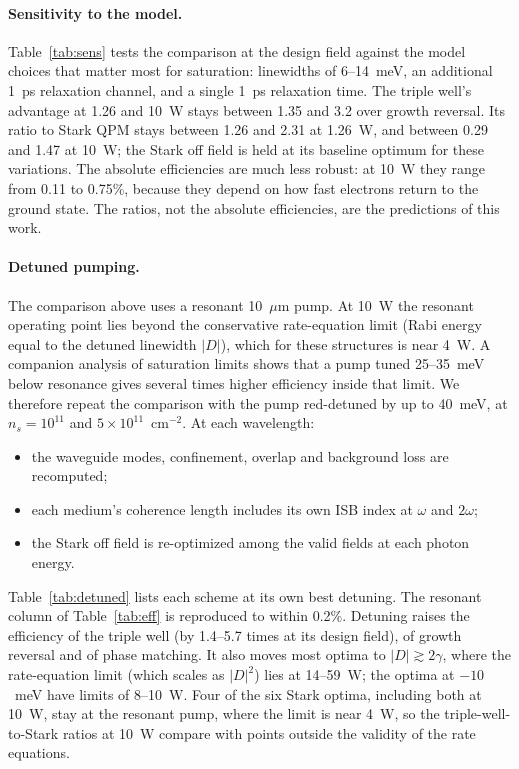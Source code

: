 \documentclass[11pt]{article}
\begin{document}
\paragraph{Sensitivity to the model.} Table~\ref{tab:sens} tests the comparison at the design field against the model choices that matter most for saturation: linewidths of 6--14~meV, an additional 1~ps relaxation channel, and a single 1~ps relaxation time. The triple well's advantage at 1.26 and 10~W stays between 1.35 and 3.2 over growth reversal. Its ratio to Stark QPM stays between 1.26 and 2.31 at 1.26~W, and between 0.29 and 1.47 at 10~W; the Stark off field is held at its baseline optimum for these variations. The absolute efficiencies are much less robust: at 10~W they range from 0.11 to 0.75\%, because they depend on how fast electrons return to the ground state. The ratios, not the absolute efficiencies, are the predictions of this work.

\paragraph{Detuned pumping.} The comparison above uses a resonant 10~$\mu$m pump. At 10~W the resonant operating point lies beyond the conservative rate-equation limit (Rabi energy equal to the detuned linewidth $|D|$), which for these structures is near 4~W. A companion analysis of saturation limits \cite{OwnbyNL02} shows that a pump tuned 25--35~meV below resonance gives several times higher efficiency inside that limit. We therefore repeat the comparison with the pump red-detuned by up to 40~meV, at $n_s=10^{11}$ and $5\times10^{11}$~cm$^{-2}$. At each wavelength:
\begin{itemize}
\item the waveguide modes, confinement, overlap and background loss are recomputed;
\item each medium's coherence length includes its own ISB index at $\omega$ and $2\omega$;
\item the Stark off field is re-optimized among the valid fields at each photon energy.
\end{itemize}
Table~\ref{tab:detuned} lists each scheme at its own best detuning. The resonant column of Table~\ref{tab:eff} is reproduced to within 0.2\%. Detuning raises the efficiency of the triple well (by 1.4--5.7 times at its design field), of growth reversal and of phase matching. It also moves most optima to $|D|\gtrsim2\gamma$, where the rate-equation limit (which scales as $|D|^2$) lies at 14--59~W; the optima at $-10$~meV have limits of 8--10~W. Four of the six Stark optima, including both at 10~W, stay at the resonant pump, where the limit is near 4~W, so the triple-well-to-Stark ratios at 10~W compare with points outside the validity of the rate equations.
\end{document}
